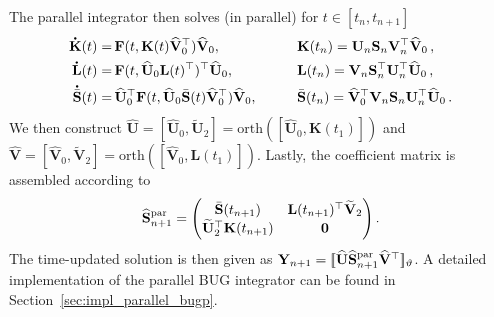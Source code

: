 \documentclass[preprint,runningheads]{svjour3}
\newcommand*{\dt}[1]{ \accentset{\mbox{\large\bfseries .}}{#1}}
\def\wh{\widehat}
\newcommand\bfF{{\mathbf F}}
\newcommand\bfK{{\mathbf K}}
\newcommand\bfL{{\mathbf L}}
\newcommand\bfS{{\mathbf S}}
\newcommand\bfU{{\mathbf U}}
\newcommand\bfV{{\mathbf V}}
\newcommand\bfY{{\mathbf Y}}
\begin{document}
 {The parallel integrator then solves (in parallel) for $t\in[t_n,t_{n+1}]$
\begin{alignat*}{2}
\label{eq:parallel_bugp_K_step}
    \dt{\bfK}(t)
    =\,&
    \bfF(t,\bfK(t)\widehat\bfV_0^\top)\widehat\bfV_0,
    \qquad
    &&\bfK(t_n)=\bfU_n\bfS_n\bfV_n^{\top}\wh\bfV_0\,,\\
    \dt{\bfL}(t)
    =\,&
    \bfF(t,\widehat\bfU_0\bfL(t)^\top)^\top\widehat\bfU_0,
    \qquad
    &&\bfL(t_n)=\bfV_n\bfS_n^{\top}\bfU_n^{\top}\wh\bfU_0\,,\\
    \dt{\bar{\bfS}}(t)
    =\,&
    \widehat\bfU_0^\top
    \bfF(t,\widehat\bfU_0\bar{\bfS}(t)\widehat\bfV_0^\top)
    \widehat\bfV_0,
    \qquad
    &&\bar{\bfS}(t_n)=\wh\bfV_0^{\top}\bfV_n\bfS_n\bfU_n^{\top}\wh\bfU_0\,.
\end{alignat*}
We then construct $\widehat \bfU= [\widehat \bfU_0, \widetilde \bfU_2] = \text{orth}([\widehat \bfU_0, \bfK(t_1)])$ and $\widehat \bfV= [\widehat \bfV_0, \widetilde \bfV_2] = \text{orth}([\widehat \bfV_0, \bfL(t_1)])$. 
Lastly, the coefficient matrix is assembled according to
\begin{equation}
\label{eq:parallel_bugp_assembled_S}
    \widehat\bfS_{n+1}^{\rm par}
    =
    \begin{pmatrix}
        \bar{\bfS}(t_{n+1})
        &
        \bfL(t_{n+1})^\top\widetilde\bfV_2
        \\
        \widetilde\bfU_2^\top\bfK(t_{n+1})
        &
        \bf0
    \end{pmatrix}.
\end{equation}
The time-updated solution is then given as $\bfY_{n+1}=[\![ \widehat\bfU\widehat\bfS_{n+1}^{\rm par}\widehat\bfV^\top]\!]_{\vartheta}$. A detailed implementation of the parallel BUG integrator can be found in Section~\ref{sec:impl_parallel_bugp}.}
\end{document}
